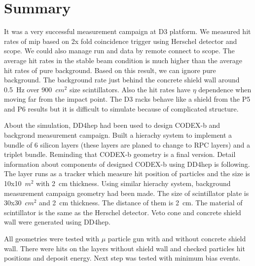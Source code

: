 \section{Summary}
\label{sec:Summary}

It was a very successful measurement campaign at D3 platform. 
We measured hit rates of mip based on 2x fold coincidence trigger using Herschel detector and scope.
We could also manage run and data by remote connect to scope.
The average hit rates in the stable beam condition is much higher than the average hit rates of pure background.
Based on this result, we can ignore pure background.
The background rate just behind the concrete shield wall around 0.5~Hz over 900~$cm^{2}$ size scintillators.
Also the hit rates have $\eta$ dependence when moving far from the impact point.
The D3 racks behave like a shield from the P5 and P6 results but it is difficult to simulate because of complicated structure.

About the simulation, DD4hep had been used to design CODEX-b and backgrond measurement campaign.
Built a hierachy system to implement a bundle of 6 silicon layers (these layers are planed to change to RPC layers) and a triplet bundle.
Reminding that CODEX-b geometry is a final version. 
Detail information about components of designed CODEX-b using DD4hep is following. 
The layer runs as a tracker which measure hit position of particles and the size is 10x10~$m^{2}$ with 2~cm thickness.
Using similar hierachy system, background measurement campaign geometry had been made.
The size of scintillator plate is 30x30~$cm^{2}$ and 2~cm thickness.
The distance of them is 2~cm.
The material of scintillator is the same as the Herschel detector.
Veto cone and concrete shield wall were generated using DD4hep.

All geometries were tested with $\mu$ particle gun with and without concrete shield wall.
There were hits on the layers without shield wall and checked particles hit positions and deposit energy.
Next step was tested with minimum bias events.




